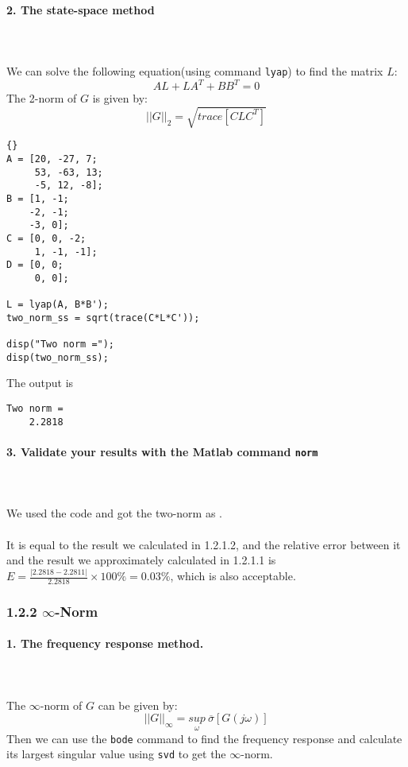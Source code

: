 \documentclass{article}
\begin{document}
\paragraph{2. The state-space method}~\\~\\
We can solve the following equation(using command \verb|lyap|) to find the matrix $L$:
$$AL+LA^T+BB^T=0$$
The 2-norm of $G$ is given by:
$$||G||_2=\sqrt{trace[CLC^T]}$$
\begin{lstlisting}{}
A = [20, -27, 7;
     53, -63, 13;
     -5, 12, -8];
B = [1, -1;
    -2, -1;
    -3, 0];
C = [0, 0, -2;
     1, -1, -1];
D = [0, 0;
     0, 0];

L = lyap(A, B*B');
two_norm_ss = sqrt(trace(C*L*C'));

disp("Two norm =");
disp(two_norm_ss);
\end{lstlisting}
The output is 
\begin{lstlisting}[numbers=none]
Two norm =
    2.2818
\end{lstlisting}

\paragraph{3. Validate your results with the Matlab command \texttt{norm}}~\\~\\
We used the code  and got the two-norm as .~\\~\\
It is equal to the result we calculated in 1.2.1.2, and the relative error between it and the result we approximately calculated in 1.2.1.1 is $E=\frac{|2.2818-2.2811|}{2.2818}\times 100\%=0.03\%$, which is also acceptable.

\subsubsection*{1.2.2 $\infty$-Norm}
\paragraph{1. The frequency response method.}~\\~\\
The $\infty$-norm of $G$ can be given by:
\[||G||_\infty= \underset{\omega}{sup}~\overline{\sigma}[G(j\omega)]\]
Then we can use the \verb|bode| command to find the frequency response and calculate its largest singular value using \verb|svd| to get the $\infty$-norm.
\end{document}
